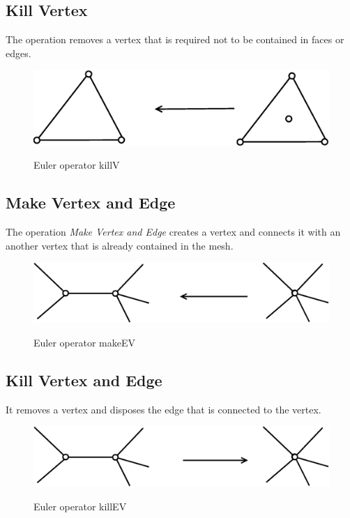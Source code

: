 \subsection{Kill Vertex}

The operation removes a vertex that is required not to be contained in faces or
edges.

\begin{figure}[h]
\centering
\includegraphics[scale=0.25]{../img/killV.eps}
\label{fig:killv}
\caption{Euler operator killV}
\end{figure}


\subsection{Make Vertex and Edge}

The operation \emph{Make Vertex and Edge} creates a vertex and connects
it with an another vertex that is already contained in the mesh.

\begin{figure}[h]
\centering
\includegraphics[scale=0.25]{../img/makeEV.eps}
\label{fig:makeev}
\caption{Euler operator makeEV}
\end{figure}

\subsection{Kill Vertex and Edge}

It removes a vertex and disposes the edge that is connected to the vertex.

\begin{figure}[H]
\centering
\includegraphics[scale=0.25]{../img/killEV.eps}
\label{fig:killev}
\caption{Euler operator killEV}
\end{figure}

